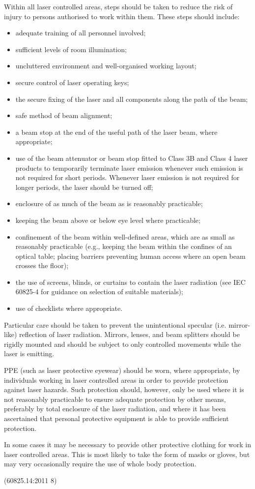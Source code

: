 \documentclass[a4paper]{scrartcl}
\begin{document}
Within all laser controlled areas, steps should be taken to reduce the risk of injury to persons authorised to work within them. These steps should include:
\begin{itemize}
    \item adequate training of all personnel involved;
    \item sufficient levels of room illumination;
    \item uncluttered environment and well-organised working layout;
    \item secure control of laser operating keys;
    \item the secure fixing of the laser and all components along the path of the beam;
    \item safe method of beam alignment;
    \item a beam stop at the end of the useful path of the laser beam, where appropriate;
    \item use of the beam attenuator or beam stop fitted to Class 3B and Class 4 laser products to temporarily terminate laser emission whenever such emission is not required for short periods. Whenever laser emission is not required for longer periods, the laser should be turned off;
    \item enclosure of as much of the beam as is reasonably practicable;
    \item keeping the beam above or below eye level where practicable;
    \item confinement of the beam within well-defined areas, which are as small as reasonably practicable (e.g., keeping the beam within the confines of an optical table; placing barriers preventing human access where an open beam crosses the floor);
    \item the use of screens, blinds, or curtains to contain the laser radiation (see IEC 60825-4 for guidance on selection of suitable materials);
    \item use of checklists where appropriate.
\end{itemize}

Particular care should be taken to prevent the unintentional specular (i.e. mirror-like) reflection of laser radiation. Mirrors, lenses, and beam splitters should be rigidly mounted and should be subject to only controlled movements while the laser is emitting.

PPE (such as laser protective eyewear) should be worn, where appropriate, by individuals working in laser controlled areas in order to provide protection against laser hazards. Such protection should, however, only be used where it is not reasonably practicable to ensure adequate protection by other means, preferably by total enclosure of the laser radiation, and where it has been ascertained that personal protective equipment is able to provide sufficient protection.

In some cases it may be necessary to provide other protective clothing for work in laser controlled areas. This is most likely to take the form of masks or gloves, but may very occasionally require the use of whole body protection.

(60825.14:2011 8)
\end{document}
